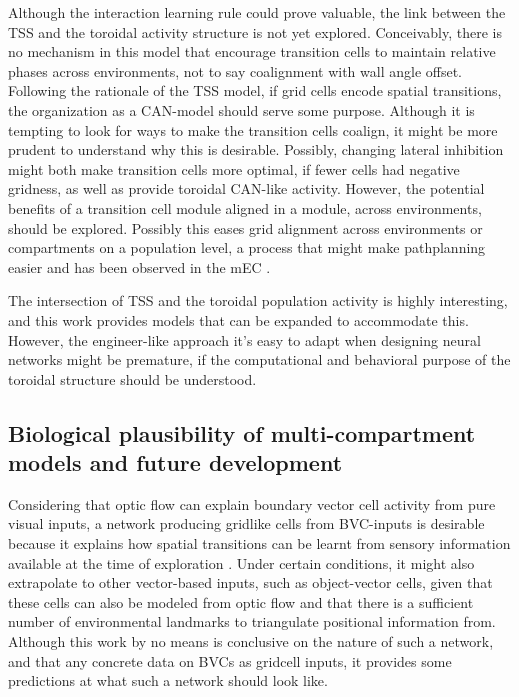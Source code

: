 \documentclass{article}
\begin{document}
    Although the interaction learning rule could prove valuable, the link between the TSS and the toroidal activity structure is not yet explored. Conceivably, there is no mechanism in this model that encourage transition cells to maintain relative phases across environments, not to say coalignment with wall angle offset. Following the rationale of the TSS model, if grid cells encode spatial transitions, the organization as a CAN-model should serve some purpose. Although it is tempting to look for ways to make the transition cells coalign, it might be more prudent to understand why this is desirable. Possibly, changing lateral inhibition might both make transition cells more optimal, if fewer cells had negative gridness, as well as provide toroidal CAN-like activity. However, the potential benefits of a transition cell module aligned in a module, across environments, should be explored. Possibly this eases grid alignment across environments or compartments on a population level, a process that might make pathplanning easier and has been observed in the mEC \parencite{Carpenter2015}.

    The intersection of TSS and the toroidal population activity is highly interesting, and this work provides models that can be expanded to accommodate this. However, the engineer-like approach it's easy to adapt when designing neural networks might be premature, if the computational and behavioral purpose of the toroidal structure should be understood.

    \subsection{Biological plausibility of multi-compartment models and future development} \label{Future: BVCs}

    Considering that optic flow can explain boundary vector cell activity from pure visual inputs, a network producing gridlike cells from BVC-inputs is desirable because it explains how spatial transitions can be learnt from sensory information available at the time of exploration \parencite{Raudies2012}. Under certain conditions, it might also extrapolate to other vector-based inputs, such as object-vector cells, given that these cells can also be modeled from optic flow and that there is a sufficient number of environmental landmarks to triangulate positional information from. Although this work by no means is conclusive on the nature of such a network, and that any concrete data on BVCs as gridcell inputs, it provides some predictions at what such a network should look like.
\end{document}
